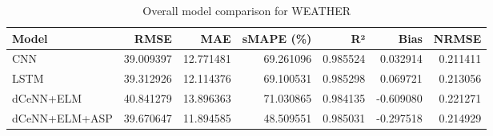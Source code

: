 \begin{table}
\caption{Overall model comparison for WEATHER}
\begin{tabular}{lrrrrrr}
\toprule
Model & RMSE & MAE & sMAPE (\%) & R² & Bias & NRMSE \\
\midrule
CNN & 39.009397 & 12.771481 & 69.261096 & 0.985524 & 0.032914 & 0.211411 \\
LSTM & 39.312926 & 12.114376 & 69.100531 & 0.985298 & 0.069721 & 0.213056 \\
dCeNN+ELM & 40.841279 & 13.896363 & 71.030865 & 0.984135 & -0.609080 & 0.221271 \\
dCeNN+ELM+ASP & 39.670647 & 11.894585 & 48.509551 & 0.985031 & -0.297518 & 0.214929 \\
\bottomrule
\end{tabular}
\end{table}

